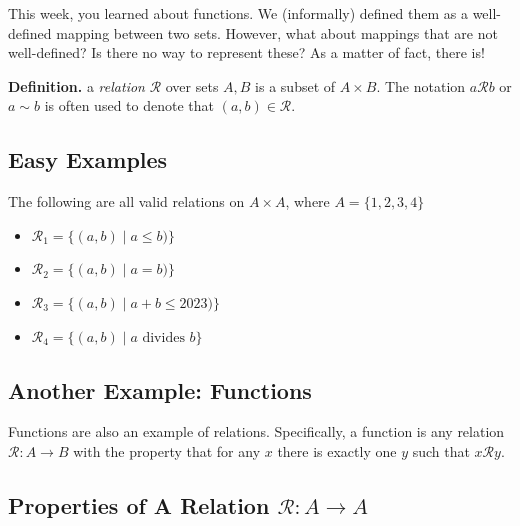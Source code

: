 \documentclass{article}
\begin{document}
    This week, you learned about functions. We (informally) defined them as a well-defined mapping between two sets. However, what about mappings that are not well-defined? Is there no way to represent these? As a matter of fact, there is!
    
    \vspace{3mm}
    \textbf{Definition.} a \textit{relation} $\mathcal{R}$ over sets $A, B$ is a subset of $A \times B$. The notation $a\mathcal{R}b$ or $a \sim b$ is often used to denote that $(a, b) \in \mathcal{R}$.

    \subsection*{Easy Examples}
    
    The following are all valid relations on $A \times A$, where $A = \{1, 2, 3, 4\}$
    \begin{itemize}
        \item $\mathcal{R}_1 = \{(a, b) \mid a \le b)\}$
        \item $\mathcal{R}_2 = \{(a, b) \mid a = b)\}$
        \item $\mathcal{R}_3 = \{(a, b) \mid a+b \le 2023)\}$
        \item $\mathcal{R}_4 = \{(a, b) \mid a \text{ divides } b\}$
    \end{itemize}

    \subsection*{Another Example: Functions}
    Functions are also an example of relations. Specifically, a function is any relation $\mathcal{R}: A \rightarrow B$ with the property that for any $x$ there is exactly one $y$ such that $x\mathcal{R}y$.
    
    
\subsection*{Properties of A Relation $\mathcal{R} \colon A \rightarrow A$}
\end{document}

